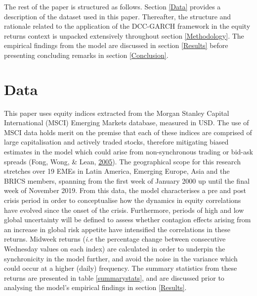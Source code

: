 \documentclass[11pt,preprint, authoryear]{elsarticle}
\numberwithin{equation}{section}
\numberwithin{figure}{section}
\numberwithin{table}{section}
\begin{document}
The rest of the paper is structured as follows. Section \ref{Data}
provides a description of the dataset used in this paper. Thereafter,
the structure and rationale related to the application of the DCC-GARCH
framework in the equity returns context is unpacked extensively
throughout section \ref{Methodology}. The empirical findings from the
model are discussed in section \ref{Results} before presenting
concluding remarks in section \ref{Conclusion}.

\hypertarget{data}{%
\section{\texorpdfstring{Data \label{Data}}{Data }}\label{data}}

This paper uses equity indices extracted from the Morgan Stanley Capital
International (MSCI) Emerging Markets database, measured in USD. The use
of MSCI data holds merit on the premise that each of these indices are
comprised of large capitalisation and actively traded stocks, therefore
mitigating biased estimates in the model which could arise from
non-synchronous trading or bid-ask spreads (Fong, Wong, \& Lean, 
\protect\hyperlink{ref-fong2005international}{2005}). The geographical
scope for this research stretches over 19 EMEs in Latin America,
Emerging Europe, Asia and the BRICS members, spanning from the first
week of January 2000 up until the final week of November 2019. From this
data, the model characterises a pre and post crisis period in order to
conceptualise how the dynamics in equity correlations have evolved since
the onset of the crisis. Furthermore, periods of high and low global
uncertainty will be defined to assess whether contagion effects arising
from an increase in global risk appetite have intensified the
correlations in these returns. Midweek returns (\emph{i.e} the
percentage change between consecutive Wednesday values on each index)
are calculated in order to underpin the synchronicity in the model
further, and avoid the noise in the variance which could occur at a
higher (daily) frequency. The summary statistics from these returns are
presented in table \ref{summarystats}, and are discussed prior to
analysing the model's empirical findings in section \ref{Results}.
\end{document}

